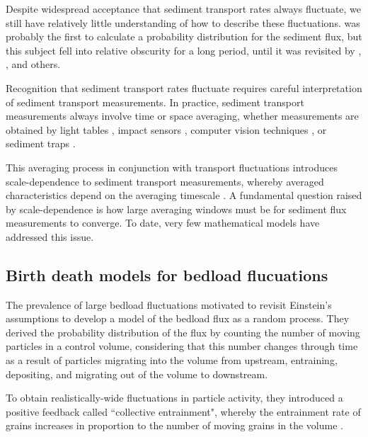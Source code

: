 Despite widespread acceptance that sediment transport rates always fluctuate, we still have relatively little understanding of how to describe these fluctuations.
\citet{Hamamori1962} was probably the first to calculate a probability distribution for the sediment flux, but this subject fell into relative obscurity for a long period, until it was revisited by \citet{Nikora1997}, \citet{Ancey2006}, and others.

Recognition that sediment transport rates fluctuate requires careful interpretation of sediment transport measurements. 
In practice, sediment transport measurements always involve time or space averaging, whether measurements are obtained by light tables \citep{Chartrand2018}, impact sensors \citep{Rickenmann2007}, computer vision techniques \citep{Roseberry2012}, or sediment traps \citep{Papangelakis2016}.

This averaging process in conjunction with transport fluctuations introduces scale-dependence to sediment transport measurements, whereby averaged characteristics depend on the averaging timescale \citep{Turowski2010,Campagnol2012,Ancey2020a}.
A fundamental question raised by scale-dependence is how large averaging windows must be for sediment flux measurements to converge.
To date, very few mathematical models have addressed this issue.

\subsection{Birth death models for bedload flucuations}
\label{sec:birthdeath}
The prevalence of large bedload fluctuations motivated \citet{Ancey2006,Ancey2008} to revisit Einstein's assumptions to develop a model of the bedload flux as a random process.
They derived the probability distribution of the flux by counting the number of moving particles in a control volume, considering that this number changes through time as a result of particles migrating into the volume from upstream, entraining, depositing, and migrating out of the volume to downstream.

To obtain realistically-wide fluctuations in particle activity, they introduced a positive feedback called ``collective entrainment", whereby the entrainment rate of grains increases in proportion to the number of moving grains in the volume \citep{Ancey2008,Heyman2013}.

